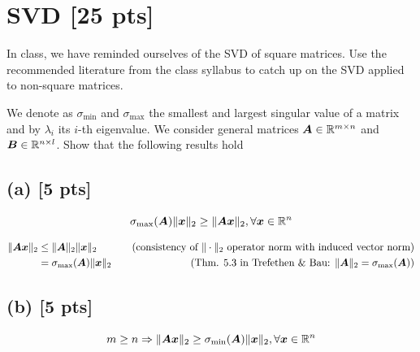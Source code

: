 \documentclass[twoside,10pt]{article}
\begin{document}
\section{SVD [25 pts]}
In class, we have reminded ourselves of the SVD of square matrices. 
Use the recommended literature from the class syllabus to catch up on the SVD applied to non-square matrices. 

We denote as $\sigma_{\mathrm{min}}$ and $\sigma_{\mathrm{max}}$ the smallest and largest singular value of a matrix and by $\lambda_{i}$ its $i$-th eigenvalue. 
We consider general matrices $\bm{A} \in \mathbb{R}^{m \times n}$ and $\bm{B} \in \mathbb{R}^{n \times l}$.
Show that the following results hold 

\subsection*{(a) [5 pts]}
  \begin{equation*}
    \sigma_{\mathrm{max}}(\bm{A}) \|\bm{x}\|_2 \geq \|\bm{A} \bm{x}\|_2, \forall \bm{x} \in \mathbb{R}^n
  \end{equation*}

\begin{align*}
 \|\bm{A} \bm{x}\|_2 &\leq \|\bm{A}\|_2\|\bm{x}\|_2 &\quad\text{(consistency of $\|\cdot\|_2$ operator norm with induced vector norm)}\\
 &= \sigma_{\mathrm{max}}(\bm{A})\|\bm{x}\|_2 &\quad\text{(Thm. 5.3 in Trefethen \& Bau: $\|\bm{A}\|_2 = \sigma_{\mathrm{max}}(\bm{A})$)}
\end{align*}

\subsection*{(b) [5 pts]}
  \begin{equation*}
    m \geq n \Rightarrow \|\mtx{A}\vct{x}\|_2 \geq \sigma_{\mathrm{min}}\left(\mtx{A}\right) \|\vct{x}\|_2, \forall \vct{x} \in \R^n
  \end{equation*}
\end{document}
